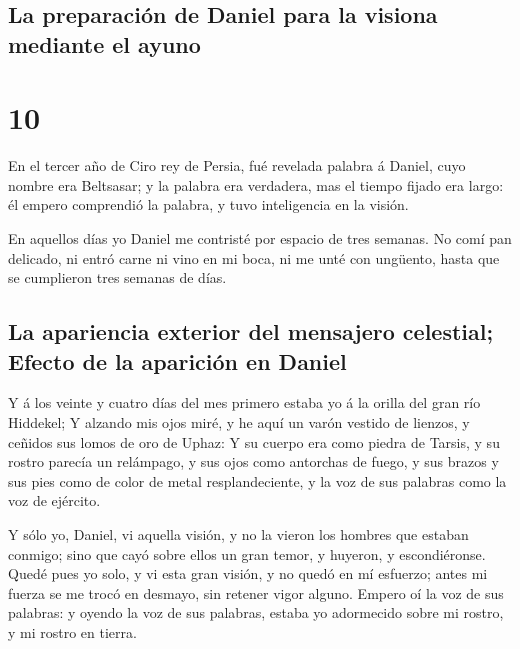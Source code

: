 \hypertarget{la-preparaciuxf3n-de-daniel-para-la-visiona-mediante-el-ayuno}{%
\subsection{La preparación de Daniel para la visiona mediante el
ayuno}\label{la-preparaciuxf3n-de-daniel-para-la-visiona-mediante-el-ayuno}}

\hypertarget{section-9}{%
\section{10}\label{section-9}}

 En el tercer año de Ciro rey de Persia, fué revelada
palabra á Daniel, cuyo nombre era Beltsasar; y la palabra era verdadera,
mas el tiempo fijado era largo: él empero comprendió la palabra, y tuvo
inteligencia en la visión.

 En aquellos días yo Daniel me contristé por espacio de
tres semanas.  No comí pan delicado, ni entró carne ni
vino en mi boca, ni me unté con ungüento, hasta que se cumplieron tres
semanas de días.

\hypertarget{la-apariencia-exterior-del-mensajero-celestial-efecto-de-la-apariciuxf3n-en-daniel}{%
\subsection{La apariencia exterior del mensajero celestial; Efecto de la
aparición en
Daniel}\label{la-apariencia-exterior-del-mensajero-celestial-efecto-de-la-apariciuxf3n-en-daniel}}

 Y á los veinte y cuatro días del mes primero estaba yo á
la orilla del gran río Hiddekel;  Y alzando mis ojos miré,
y he aquí un varón vestido de lienzos, y ceñidos sus lomos de oro de
Uphaz:  Y su cuerpo era como piedra de Tarsis, y su rostro
parecía un relámpago, y sus ojos como antorchas de fuego, y sus brazos y
sus pies como de color de metal resplandeciente, y la voz de sus
palabras como la voz de ejército.

 Y sólo yo, Daniel, vi aquella visión, y no la vieron los
hombres que estaban conmigo; sino que cayó sobre ellos un gran temor, y
huyeron, y escondiéronse.  Quedé pues yo solo, y vi esta
gran visión, y no quedó en mí esfuerzo; antes mi fuerza se me trocó en
desmayo, sin retener vigor alguno.  Empero oí la voz de
sus palabras: y oyendo la voz de sus palabras, estaba yo adormecido
sobre mi rostro, y mi rostro en tierra.

